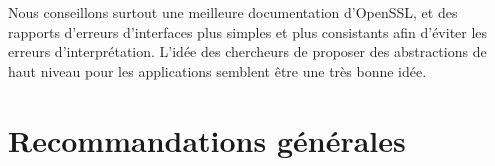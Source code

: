 			Nous conseillons surtout une meilleure documentation d'OpenSSL, et des rapports d'erreurs d'interfaces plus simples et plus consistants afin d'éviter les erreurs d'interprétation. L'idée des chercheurs de proposer des abstractions de haut niveau pour les applications semblent être une très bonne idée.
		

\section{Recommandations générales}
